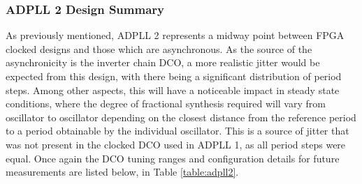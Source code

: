 \subsubsection{\acs{ADPLL} 2 Design Summary}
As previously mentioned, \ac{ADPLL} 2 represents a midway point between \ac{FPGA} clocked designs and those which are asynchronous. As the source of the asynchronicity is the inverter chain \ac{DCO}, a more realistic jitter would be expected from this design, with there being a significant distribution of period steps. Among other aspects, this will have a noticeable impact in steady state conditions, where the degree of fractional synthesis required will vary from oscillator to oscillator depending on the closest distance from the reference period to a period obtainable by the individual oscillator. This is a source of jitter that was not present in the clocked \ac{DCO} used in \ac{ADPLL} 1, as all period steps were equal. Once again the \ac{DCO} tuning ranges and configuration details for future measurements are listed below, in Table \ref{table:adpll2}.

